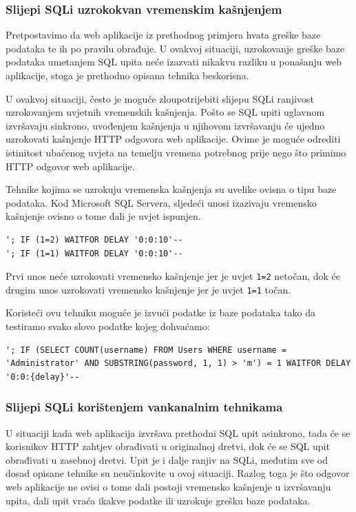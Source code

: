 \documentclass[12pt, oneside, onecolumn]{book}
\begin{document}
{\subsubsection{Slijepi SQLi uzrokokvan vremenskim kašnjenjem}
Pretpostavimo da web aplikacije iz prethodnog primjera hvata greške baze podataka te ih po pravilu obrađuje. U ovakvoj situaciji, uzrokovanje greške baze podataka umetanjem SQL upita neće izazvati nikakvu razliku u ponašanju web aplikacije, stoga je prethodno opisana tehnika beskorisna.

U ovakvoj situaciji, često je moguće zloupotrijebiti slijepu SQLi ranjivost uzrokovanjem uvjetnih vremenskih kašnjenja. Pošto se SQL upiti uglavnom izvršavaju sinkrono, uvođenjem kašnjenja u njihovom izvršavanju će ujedno uzrokovati kašnjenje HTTP odgovora web aplikacije. Ovime je moguće odrediti istinitost ubačenog uvjeta na temelju vremena potrebnog prije nego što primimo HTTP odgovor web aplikacije.

Tehnike kojima se uzrokuju vremenska kašnjenja su uvelike ovisna o tipu baze podataka. Kod Microsoft SQL Servera, sljedeći unosi izazivaju vremensko kašnjenje ovisno o tome dali je uvjet ispunjen.

\begin{verbatim}
'; IF (1=2) WAITFOR DELAY '0:0:10'--
'; IF (1=1) WAITFOR DELAY '0:0:10'--
\end{verbatim}

Prvi unos neće uzrokovati vremensko kašnjenje jer je uvjet \texttt{1=2} netočan, dok će drugim unos uzrokovati vremensko kašnjenje jer je uvjet \texttt{1=1} točan.

Koristeći ovu tehniku moguće je izvući podatke iz baze podataka tako da testiramo svako slovo podatke kojeg dohvaćamo:

\begin{verbatim}
'; IF (SELECT COUNT(username) FROM Users WHERE username = 'Administrator' AND SUBSTRING(password, 1, 1) > 'm') = 1 WAITFOR DELAY '0:0:{delay}'--
\end{verbatim}

\subsubsection{Slijepi SQLi korištenjem vankanalnim tehnikama}
U situaciji kada web aplikacija izvršava prethodni SQL upit asinkrono, tada će se korisnikov HTTP zahtjev obrađivati u originalnoj dretvi, dok će se SQL upit obrađivati u zasebnoj dretvi. Upit je i dalje ranjiv na SQLi, međutim sve od dosad opisane tehnike su neučinkovite u ovoj situaciji. Razlog toga je što odgovor web aplikacije ne ovisi o tome dali postoji vremensko kašnjenje u izvršavanju upita, dali upit vraća ikakve podatke ili uzrokuje grešku baze podataka.

}
\end{document}
